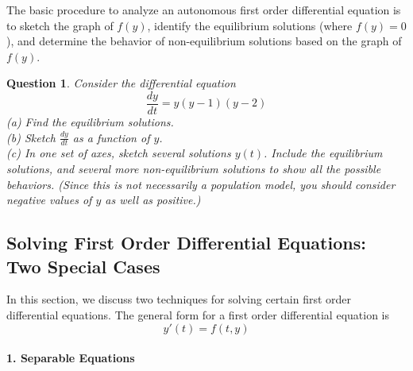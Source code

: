\documentclass{book}
\newtheorem{question}{Question}
\begin{document}
The basic procedure to analyze an autonomous
first order differential equation is to sketch the graph of $f(y)$, identify
the equilibrium solutions (where $f(y)=0$), and determine the
behavior of non-equilibrium solutions based on the graph
of $f(y)$.

\begin{question}
Consider the differential equation
\[
   \frac{dy}{dt} = y(y-1)(y-2)
\]
(a) Find the equilibrium solutions.\\
(b) Sketch $\frac{dy}{dt}$ as a function of $y$.\\
(c) In one set of axes, sketch several solutions $y(t)$. Include the equilibrium solutions,
and several more non-equilibrium solutions to show all the possible behaviors.
(Since this is not necessarily a population model, you should consider negative values
of $y$ as well as positive.)
\end{question}

\subsection{Solving First Order Differential Equations: Two Special Cases}

In this section, we discuss
two techniques for solving certain first order
differential equations.
The general form for a first order differential equation is
\begin{equation}
   y'(t) = f(t,y)
\end{equation}
\paragraph{1. Separable Equations} ~
\end{document}
